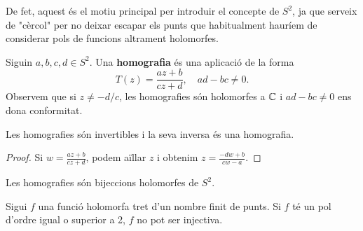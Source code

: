 \documentclass[dvipsnames, svgnames, leqno, a4paper, 12pt]{article}
\begin{document}
        De fet, aquest és el motiu principal per introduir el concepte de \(S^2\), ja que serveix de "cèrcol" per no deixar escapar els punts que habitualment hauríem de considerar pols de funcions altrament holomorfes.

        Siguin \(a,b,c,d\in S^2\). Una \textbf{homografia} és una aplicació de la forma
        \begin{displaymath}
            T(z)=\frac{az+b}{cz+d},\quad ad-bc\neq0.
        \end{displaymath}
        Observem que si $z\neq -d/c$, les homografies són holomorfes a $\mathbb{C}$ i $ad-bc\neq0$ ens dona conformitat.
        
        \begin{proposition}
            Les homografies són invertibles i la seva inversa és una homografia.
        \end{proposition}
        
        \begin{proof}
            Si \begin{math}
                 w  = \frac{az+b}{cz+d} 
            \end{math}, podem aïllar $z$ i obtenim \begin{math}
                z = \frac{-d  w +b}{c w -a}
            \end{math}.
        \end{proof}

        \begin{corollary}
            Les homografies són bijeccions holomorfes de $S^2$.
        \end{corollary}

        \begin{lemma}
            Sigui $f$  una funció holomorfa tret d'un nombre finit de punts. Si $f$ té un pol d'ordre igual o superior a 2, $f$ no pot ser injectiva.  
        \end{lemma}
\end{document}

